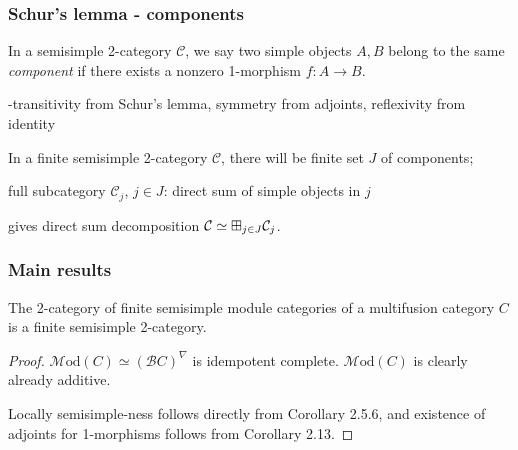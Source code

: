 \documentclass{beamer}
\newcommand{\cB}{{\mathcal{B}}}
\newcommand{\cC}{{\mathcal{C}}}
\newcommand{\bigboxplus}{\Huge \boxplus}
\newcommand{\Mod}{{\mathcal{M}\textrm{od}}}
\newcommand{\ModA}[1]{{\Mod(#1)}}
\begin{document}
\begin{frame}
\frametitle{Schur's lemma - components}


\begin{definition}
In a semisimple 2-category $\cC$,
we say two simple objects $A,B$ belong to the same
\emph{component} if there exists a nonzero 1-morphism
$f: A \to B$.
\end{definition}

\pause

-transitivity from Schur's lemma, symmetry from adjoints,
reflexivity from identity

\pause

In a finite semisimple 2-category $\cC$,
there will be finite set $J$ of components;

\pause

full subcategory $\cC_j$, $j \in J$:
direct sum of simple objects in $j$

\pause

gives direct sum decomposition
$\cC \simeq \bigboxplus_{j \in J} \cC_j$.

\end{frame}


\begin{frame}
\frametitle{Main results}

\begin{theorem}
The 2-category of finite semisimple module categories
of a multifusion category $C$
is a finite semisimple 2-category.
\end{theorem}

\pause

\begin{proof}
$\ModA{C} \simeq (\cB C)^\nabla$ is idempotent complete.
$\ModA{C}$ is clearly already additive.


Locally semisimple-ness follows directly from
\cite{DSPSb}{Corollary 2.5.6},
and existence of adjoints for 1-morphisms
follows from \cite{DSPSa}{Corollary 2.13}.

\end{proof}

\end{frame}
\end{document}
